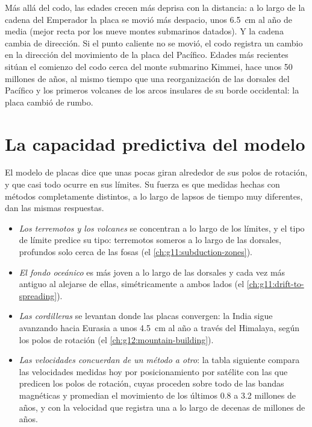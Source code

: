 Más allá del codo, las edades crecen más deprisa con la distancia: a lo largo
de la cadena del Emperador la placa se movió más despacio, unos
\qty{6.5}{cm} al año de media (mejor recta por los nueve montes submarinos
datados). Y la cadena cambia de dirección. Si el punto caliente no se movió,
el codo registra un cambio en la dirección del movimiento de la placa del
Pacífico. Edades más recientes sitúan el comienzo del codo cerca del monte
submarino Kimmei, hace unos 50 millones de años, al mismo tiempo que una
reorganización de las dorsales del Pacífico y los primeros volcanes de los
arcos insulares de su borde occidental: la placa cambió de rumbo.

\section{La capacidad predictiva del modelo}\label{sec:g11:plate-motions:predictive}

El modelo de placas dice que unas pocas  giran alrededor de sus
polos de rotación, y que casi todo ocurre en sus límites. Su fuerza es que
medidas hechas con métodos completamente distintos, a lo largo de lapsos de
tiempo muy diferentes, dan las mismas respuestas.

\begin{itemize}
  \item \emph{Los terremotos y los volcanes} se concentran a lo largo de los
        límites, y el tipo de límite predice su tipo: terremotos someros a lo
        largo de las dorsales, profundos solo cerca de las fosas (el \cref{ch:g11:subduction-zones}).
  \item \emph{El fondo oceánico} es más joven a lo largo de las dorsales y
        cada vez más antiguo al alejarse de ellas, simétricamente a ambos lados
        (el \cref{ch:g11:drift-to-spreading}).
  \item \emph{Las cordilleras} se levantan donde las placas convergen: la
        India sigue avanzando hacia Eurasia a unos \qty{4.5}{cm} al año a
        través del Himalaya, según los polos de rotación (el \cref{ch:g12:mountain-building}).
  \item \emph{Las velocidades concuerdan de un método a otro}: la tabla
        siguiente compara las velocidades medidas hoy por posicionamiento por
        satélite con las que predicen los polos de rotación, cuyas  proceden sobre todo de las bandas magnéticas y promedian
        el movimiento de los últimos \num{0.8} a \num{3.2} millones de años, y
        con la velocidad que registra una  a lo largo
        de decenas de millones de años.
\end{itemize}

